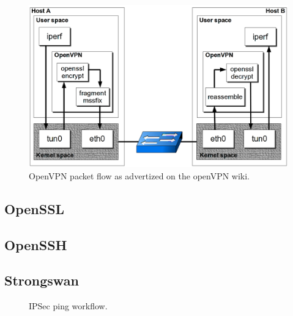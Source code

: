 \begin{figure}[ht]
\includegraphics[width=\textwidth]{OpenVPN-packetflow}
\caption{OpenVPN packet flow as advertized on the openVPN wiki.}
\label{fig:openvpn-packet-flow}
\end{figure}

\subsection{OpenSSL}


\subsection{OpenSSH}


\subsection{Strongswan}

\begin{figure}[ht]
\Large
\resizebox{\linewidth}{!}{%

}
\caption{IPSec ping workflow.}
\label{fig:ipsec-workflow}
\end{figure}


